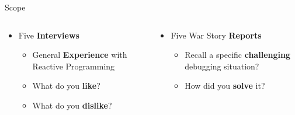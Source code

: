 \documentclass[aspectratio=169]{beamer}
\begin{document}
\begin{frame}[fragile]{Scope}
    \begin{columns}[T]
        \begin{column}{.4\linewidth}
            \begin{itemize}
                \item Five \textbf{Interviews}\vspace{1em}
                \begin{itemize}
                    \item General \textbf{Experience} with Reactive Programming\vspace{0.7em}
                    \item What do you \textbf{like}?\vspace{0.7em}
                    \item What do you \textbf{dislike}?
                \end{itemize}
        	\end{itemize}
        \end{column}
        \begin{column}{.4\linewidth}
            \begin{itemize}
                \item Five War Story \textbf{Reports}\vspace{1em}
                \begin{itemize}
            		\item Recall a specific \textbf{challenging} debugging situation?\vspace{0.7em}
            		\item How did you \textbf{solve} it?
        		\end{itemize}
        	\end{itemize}
        \end{column}
    \end{columns}
\end{frame}

\end{document}
